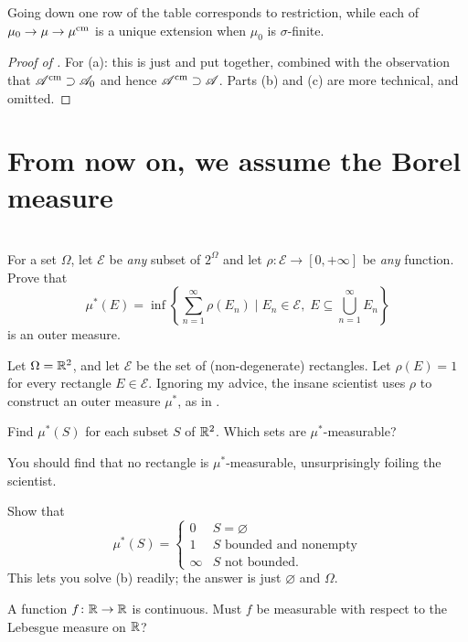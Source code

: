 Going down one row of the table corresponds to restriction,
while each of $\mu_0 \to \mu \to \mu^\text{cm}$ is a unique extension
when $\mu_0$ is $\sigma$-finite.
\begin{proof}
	[Proof of ]
	For (a): this is just  and 
	put together, combined with the observation that $\mathscr A^\text{cm} \supset \mathscr A_0$
	and hence $\mathscr A^\text{cm} \supset \mathscr A$.
	Parts (b) and (c) are more technical, and omitted.
\end{proof}

\section{From now on, we assume the Borel measure}

\section{\problemhead}
\begin{dproblem}
	\label{pr:construct_outer_measure}
	For a set $\Omega$,
	let $\mathcal{E}$ be \emph{any} subset of $2^{\Omega}$
	and let $\rho \colon \mathcal{E} \to [0,+\infty]$
	be \emph{any} function.
	Prove that
	\[ \mu^\ast(E) = \inf \left\{ \sum_{n=1}^\infty \rho(E_n) \mid
		E_n \in \mathcal{E}, \;
		E \subseteq \bigcup_{n=1}^\infty E_n \right\} \]
	is an outer measure.
\end{dproblem}

\begin{problem}
	Let $\Omega = \mathbb R^2$, and let $\mathcal{E}$
	be the set of (non-degenerate) rectangles.
	Let $\rho(E) = 1$ for every rectangle $E \in \mathcal{E}$.
	Ignoring my advice, the insane scientist
	uses $\rho$ to construct an outer measure $\mu^\ast$,
	as in .
	\begin{enumerate}[(a)]
		\ii Find $\mu^\ast(S)$ for each subset $S$ of $\mathbb R^2$.
		\ii Which sets are $\mu^\ast$-measurable?
	\end{enumerate}
	You should find that no rectangle is $\mu^\ast$-measurable,
	unsurprisingly foiling the scientist.
	\begin{hint}
		Show that
		\[ \mu^\ast(S) = \begin{cases}
				0 & S = \varnothing \\
				1 & S \text{ bounded and nonempty} \\
				\infty & S \text{ not bounded}.
			\end{cases}
		\]
		This lets you solve (b) readily;
		the answer is just $\varnothing$ and $\Omega$.
	\end{hint}
\end{problem}

\begin{problem}
	\onechili
	A function $f \colon \mathbb R \to \mathbb R$ is continuous.
	Must $f$ be measurable with respect to the Lebesgue measure on $\mathbb R$?
\end{problem}
